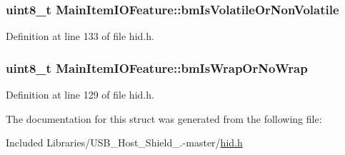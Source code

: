 \hypertarget{struct_main_item_i_o_feature_aaa20e71b24fe2de818a85b0cbdcba33e}{
\subsubsection[{bm\-Is\-Volatile\-Or\-Non\-Volatile}]{\setlength{\rightskip}{0pt plus 5cm}uint8\-\_\-t {\bf \-Main\-Item\-I\-O\-Feature\-::bm\-Is\-Volatile\-Or\-Non\-Volatile}}}\label{struct_main_item_i_o_feature_aaa20e71b24fe2de818a85b0cbdcba33e}


\-Definition at line 133 of file hid.\-h.

\hypertarget{struct_main_item_i_o_feature_a7acdfbb4a6b53046205cccae67fa26d4}{
\subsubsection[{bm\-Is\-Wrap\-Or\-No\-Wrap}]{\setlength{\rightskip}{0pt plus 5cm}uint8\-\_\-t {\bf \-Main\-Item\-I\-O\-Feature\-::bm\-Is\-Wrap\-Or\-No\-Wrap}}}\label{struct_main_item_i_o_feature_a7acdfbb4a6b53046205cccae67fa26d4}


\-Definition at line 129 of file hid.\-h.



\-The documentation for this struct was generated from the following file\-:\begin{DoxyCompactItemize}
\item 
\-Included Libraries/\-U\-S\-B\-\_\-\-Host\-\_\-\-Shield\-\_.-\/master/\hyperlink{hid_8h}{hid.\-h}\end{DoxyCompactItemize}
